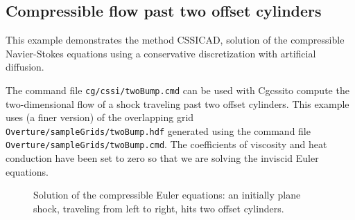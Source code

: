 \documentclass{article}
\newcommand{\cssiDocDir}{../cssi}
\newcommand{\Solver}{Cgcssi}
\begin{document}
\clearpage
\subsection{Compressible flow past two offset cylinders}

This example demonstrates the method CSSICAD, solution of the compressible Navier-Stokes equations
using a conservative discretization with artificial diffusion.

The command file {\tt cg/cssi/twoBump.cmd} can be used with \Solver to compute the
two-dimensional flow of a shock traveling past two offset cylinders. 
This example uses (a finer version) of the overlapping grid {\tt Overture/\-sampleGrids/\-twoBump.hdf}  generated
using the command file {\tt Overture/\-sampleGrids/\-twoBump.cmd}.
The coefficients of viscosity and heat conduction have been set to zero so that we
are solving the inviscid Euler equations.

{
\newcommand{\figWidth}{10cm}
\newcommand{\trimfig}[2]{\trimPlot{#1}{#2}{.12}{.15}{.35}{.325}}
\begin{figure}[hbt]
\begin{center}
\end{center}
\caption{Solution of the compressible Euler equations: an initially plane shock, traveling from left to right,
    hits two offset cylinders.}
  \label{fig:cylinder}
\end{figure}
}


\end{document}
